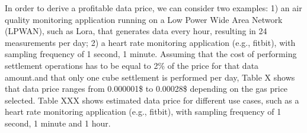 In order to derive a profitable data price, we can consider two examples: 1) an air quality monitoring application running on a Low Power Wide Area Network (LPWAN), such as Lora, that generates data every hour, resulting in 24 measurements per day; 2) a heart rate monitoring application (e.g., fitbit), with sampling frequency of 1 second, 1 minute.  
Assuming that the cost of performing settlement operations has to be equal to 2\% of the price for that data amount.and that only one cube settlement is performed per day, Table X shows that data price ranges from 0.000001\$ to 0.00028\$ depending on the gas price selected. 
Table XXX shows estimated data price for different use cases, such as a heart rate monitoring application (e.g., fitbit), with sampling frequency of 1 second, 1 minute and 1 hour.   



%
%
%
%
%
%
